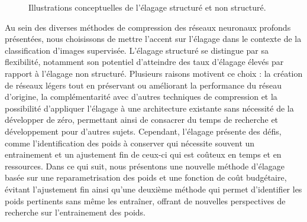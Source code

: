 \begin{figure}
  \centering
  \hspace{0.09\textwidth}
  \caption{Illustrations conceptuelles de l'élagage structuré et non structuré.}
  \label{fig:sota:pruning}
\end{figure}

Au sein des diverses méthodes de compression des réseaux neuronaux profonds
présentées, nous choisissons de mettre l'accent sur l'élagage dans le contexte
de la classification d'images supervisée. L'élagage structuré se distingue par
sa flexibilité, notamment son potentiel d'atteindre des taux d'élagage élevés
par rapport à l'élagage non structuré. Plusieurs raisons motivent ce choix : la
création de réseaux légers tout en préservant ou améliorant la performance du
réseau d'origine, la complémentarité avec d'autres techniques de compression et
la possibilité d'appliquer l'élagage à une architecture existante sans nécessité
de la développer de zéro, permettant ainsi de consacrer du temps de recherche et
développement pour d'autres sujets. Cependant, l'élagage présente des défis,
comme l'identification des poids à conserver qui nécessite souvent un
entrainement et un ajustement fin de ceux-ci qui est coûteux en temps et en
ressources. Dans ce qui suit, nous présentons une nouvelle méthode d'élagage
basée sur une reparametrisation des poids et une fonction de coût budgétaire,
évitant l'ajustement fin ainsi qu'une deuxième méthode qui permet d'identifier
les poids pertinents sans même les entraîner, offrant de nouvelles perspectives
de recherche sur l'entrainement des poids.

